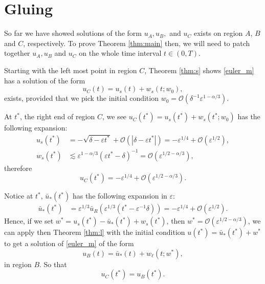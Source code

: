 \documentclass[letterpaper,11pt]{article}
\newcommand{\rmO}{\mathcal{O}}
\newcommand{\eps}{\varepsilon}
\newcommand{\lar}{ \lesssim }
\numberwithin{equation}{section}
\theoremstyle{plain}
\begin{document}
\section{Gluing}\label{sec_glue}
So far we have showed solutions of the form $u_A,u_B,$ and $u_C$ exists on region $A$, $B$ and $C$, respectively. To prove Theorem \ref{thm:main} then, we will need to patch together $u_A, u_B$ and $u_C$ on the whole time interval $t \in (0,T)$.

Starting with the left most point in region $C$, Theorem \ref{thm:s} shows \eqref{euler_m} has
a solution of the form
\[
u_C(t) = u_s(t) + w_s(t;w_0),
\]
exists, provided that we pick the initial condition $w_0= \rmO(\delta^{-1}\eps^{1-\alpha/3})$.

At $t^*$, the right end of region $C$, we see $u_C(t^*) = u_s(t^*) + w_s(t^*; w_0)$ has the following expansion:
\begin{align*}
u_s(t^*) &= -\sqrt{\delta-\eps t^*}+\rmO(|\delta-\eps t^*|) = -\eps^{1/4}+\rmO(\eps^{1/2}),\\
w_s(t^*) &\lar \eps^{1-\alpha/3}(\eps t^*-\delta)^{-1} =  \rmO(\eps^{1/2-\alpha/3}),
\end{align*}
therefore
\[
 u_C(t^*) = -\eps^{1/4} + \rmO(\eps^{1/2-\alpha/3}).
\]

Notice at $t^*$, $\bar{u}_*(t^*)$ has the following expansion in $\eps$:
\begin{align*}
\bar{u}_*(t^*) &= \eps^{1/3}\bar{u}_R(\eps^{1/3}(t^*-\eps^{-1}\delta)) = -\eps^{1/4}+ \rmO(\eps^{1/2}).
\end{align*}
Hence, if we set $w^* = u_s(t^*)-\bar{u}_*(t^*)+w_s(t^*)$, then $w^* = \rmO(\eps^{1/2-\alpha/3})$, we can apply then Theorem \ref{thm:l} with the initial condition $u(t^*)=  \bar{u}_*(t^*) + w^*$ to get a solution of \eqref{euler_m} of the form
\[
u_B(t) = \bar{u}_*(t) + w_\ell(t; w^*),
\]
in region $B$. So that
\begin{equation} \label{match_bc}
u_C(t^*) = u_B(t^*).
\end{equation}
\end{document}
